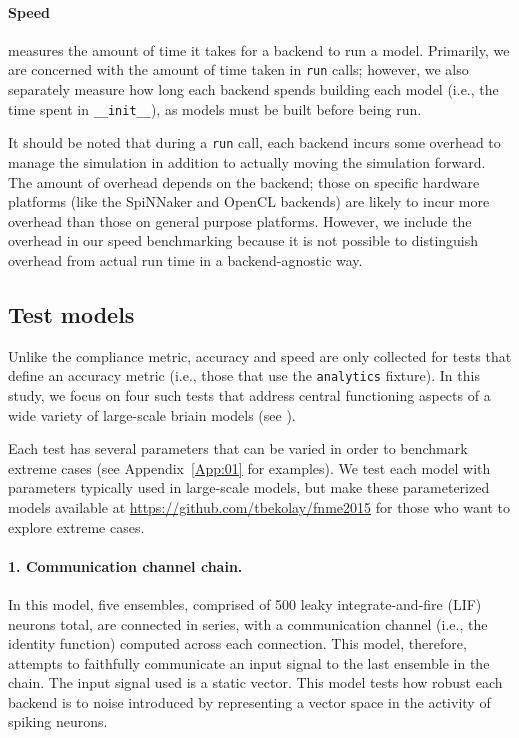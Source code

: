 \documentclass{frontiersSCNS}
\begin{document}
\paragraph{Speed}
measures the amount of time it takes
for a backend to run a model.
Primarily, we are concerned with
the amount of time taken
in \texttt{run} calls;
however, we also separately measure how long
each backend spends building each model
(i.e., the time spent in \texttt{\_\_init\_\_}),
as models must be built before being run.

It should be noted that
during a \texttt{run} call,
each backend incurs some overhead
to manage the simulation in addition
to actually moving the simulation forward.
The amount of overhead depends
on the backend; those on specific hardware platforms
(like the SpiNNaker and OpenCL backends)
are likely to incur more overhead
than those on general purpose platforms.
However, we include the overhead in
our speed benchmarking because
it is not possible to distinguish
overhead from actual run time
in a backend-agnostic way.

\subsection{Test models}

Unlike the compliance metric,
accuracy and speed are only collected
for tests that define an accuracy metric
(i.e., those that use the \texttt{analytics} fixture).
In this study, we focus on four such tests
that address central functioning aspects
of a wide variety of large-scale briain models
(see \cite{eliasmith2003a,eliasmith2013}).

Each test has several parameters
that can be varied
in order to benchmark extreme cases
(see Appendix~\ref{App:01} for examples).
We test each model with parameters
typically used in large-scale models,
but make these parameterized models
available at \url{https://github.com/tbekolay/fnme2015}
for those who want to explore extreme cases.

\paragraph{1. Communication channel chain.}
In this model,
five ensembles,
comprised of 500 leaky integrate-and-fire (LIF) neurons total,
are connected in series,
with a communication channel
(i.e., the identity function)
computed across each connection.
This model, therefore, attempts to faithfully
communicate an input signal to
the last ensemble in the chain.
The input signal used is a static vector.
This model tests how
robust each backend is to noise introduced
by representing a vector space
in the activity of spiking neurons.
\end{document}
